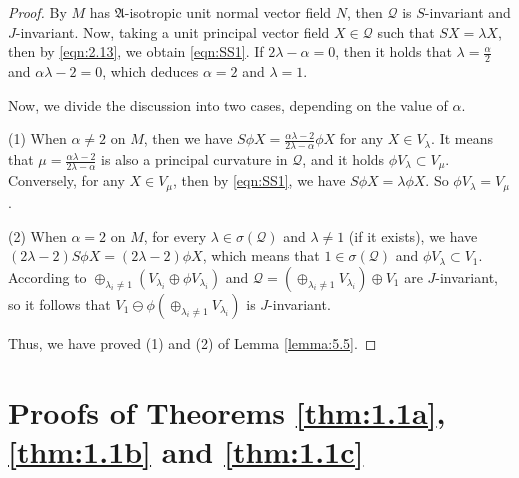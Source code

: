 \documentclass[reqno]{amsart}%
\theoremstyle{definition}
\numberwithin{equation}{section}
\begin{document}
\begin{proof}
By $M$ has $\mathfrak{A}$-isotropic unit normal vector field $N$, then $\mathcal{Q}$ is $S$-invariant and $J$-invariant.
Now, taking a unit principal vector field $X\in\mathcal{Q}$ such that $SX=\lambda X$, then by \eqref{eqn:2.13},
we obtain \eqref{eqn:SS1}. If $2\lambda-\alpha=0$, then it holds that
$\lambda=\frac{\alpha}{2}$ and $\alpha\lambda-2=0$, which deduces $\alpha=2$ and $\lambda=1$.

Now, we divide the discussion into two cases, depending on the value of $\alpha$.

(1) When $\alpha\neq2$ on $M$, then we have $S\phi X=\frac{\alpha\lambda-2}{2\lambda-\alpha}\phi X$ for any $X\in V_\lambda$. It means that $\mu=\tfrac{\alpha\lambda-2}{2\lambda-\alpha}$ is also a principal curvature in $\mathcal{Q}$, and it holds $\phi V_{\lambda}\subset V_{\mu}$.
Conversely, for any $X\in V_{\mu}$, then by \eqref{eqn:SS1}, we have $S\phi X=\lambda \phi X$.
So $\phi V_{\lambda}=V_{\mu}$.


(2) When $\alpha=2$ on $M$, for every $\lambda\in\sigma(\mathcal{Q})$
and $\lambda\neq1$ (if it exists), we have $(2\lambda-2)S\phi X=(2\lambda-2)\phi X$,
which means that $1\in\sigma(\mathcal{Q})$ and $\phi V_{\lambda}\subset V_{1}$.
According to $\oplus_{\lambda_i\neq1}(V_{\lambda_i}\oplus \phi V_{\lambda_i})$ and
$\mathcal{Q}=(\oplus_{\lambda_i\neq1}V_{\lambda_i})\oplus V_1$ are $J$-invariant, so
it follows that $V_1\ominus\phi(\oplus_{\lambda_i\neq1}V_{\lambda_i})$ is $J$-invariant.



Thus, we have proved (1) and (2) of Lemma \ref{lemma:5.5}.
\end{proof}

\section{Proofs of Theorems \ref{thm:1.1a}, \ref{thm:1.1b} and \ref{thm:1.1c}}\label{sect:5}
\end{document}

